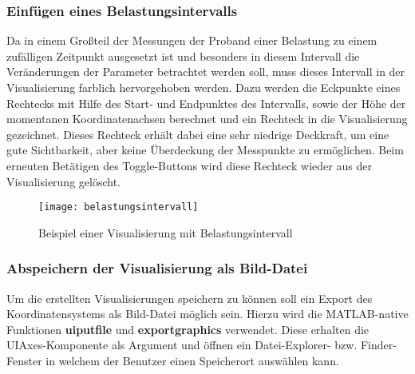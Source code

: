\subsubsection{Einfügen eines Belastungsintervalls}

Da in einem Großteil der Messungen der Proband einer Belastung zu einem zufälligen Zeitpunkt ausgesetzt ist und besonders in diesem Intervall die Veränderungen der Parameter betrachtet werden soll, muss dieses Intervall in der Visualisierung farblich hervorgehoben werden. Dazu werden die Eckpunkte eines Rechtecks mit Hilfe des Start- und Endpunktes des Intervalls, sowie der Höhe der momentanen Koordinatenachsen berechnet und ein Rechteck in die Visualisierung gezeichnet. Dieses Rechteck erhält dabei eine sehr niedrige Deckkraft, um eine gute Sichtbarkeit, aber keine Überdeckung der Messpunkte zu ermöglichen. Beim erneuten Betätigen des Toggle-Buttons wird diese Rechteck wieder aus der Visualisierung gelöscht.

\begin{minipage}{\linewidth}

\end{minipage}

\begin{figure}[H]
	\centering
	\texttt{[image: belastungsintervall]}
	\caption{Beispiel einer Visualisierung mit Belastungsintervall}
	\label{fig:belastungsintervall}
\end{figure}

\subsubsection{Abspeichern der Visualisierung als Bild-Datei}

Um die erstellten Visualisierungen speichern zu können soll ein Export des Koordinatensystems als Bild-Datei möglich sein. Hierzu wird die MATLAB-native Funktionen \textbf{uiputfile} und \textbf{exportgraphics} verwendet. Diese erhalten die UIAxes-Komponente als Argument und öffnen ein Datei-Explorer- bzw. Finder-Fenster in welchem der Benutzer einen Speicherort auswählen kann.

\begin{minipage}{\linewidth}

\end{minipage}

